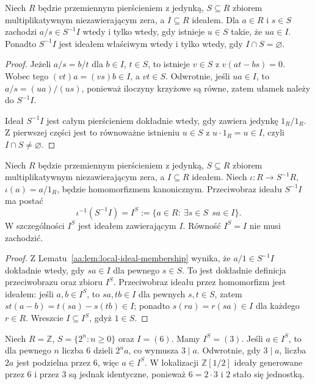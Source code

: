\begin{lemat}
\label{aa:lem:local-ideal-membership}
Niech $R$ będzie przemiennym pierścieniem z jedynką,
$S\subseteq R$ zbiorem multiplikatywnym niezawierającym
zera, a $I\subseteq R$ ideałem. Dla $a\in R$ i $s\in S$ zachodzi
$a/s\in S^{-1}I$ wtedy i tylko wtedy, gdy
istnieje $u\in S$ takie, że $ua\in I$.
Ponadto $S^{-1}I$ jest ideałem właściwym wtedy
i tylko wtedy, gdy $I\cap S=\varnothing$.
\end{lemat}
\begin{proof}
Jeżeli $a/s=b/t$ dla $b\in I$, $t\in S$,
to istnieje $v\in S$ z $v(at-bs)=0$.
Wobec tego $(vt)a=(vs)b\in I$, a $vt\in S$.
Odwrotnie, jeśli $ua\in I$, to
$a/s=(ua)/(us)$, ponieważ iloczyny krzyżowe są
równe, zatem ułamek należy do $S^{-1}I$.

Ideał $S^{-1}I$ jest całym pierścieniem dokładnie wtedy,
gdy zawiera jedynkę $1_R/1_R$. Z pierwszej części
jest to równoważne istnieniu $u\in S$ z
$u\cdot1_R=u\in I$, czyli $I\cap S\ne\varnothing$.
\end{proof}

\begin{twierdzenie}
\label{aa:tw:localization-saturation}
Niech $R$ będzie przemiennym pierścieniem z jedynką,
$S\subseteq R$ zbiorem multiplikatywnym niezawierającym
zera, a $I\subseteq R$ ideałem. Niech
$\iota:R\to S^{-1}R$, $\iota(a)=a/1_R$, będzie
homomorfizmem kanonicznym. Przeciwobraz ideału
$S^{-1}I$ ma postać
\[
 \iota^{-1}(S^{-1}I)=I^S
 :=\{a\in R:\ \exists s\in S\ \ sa\in I\}.
\]
W szczególności $I^S$ jest ideałem zawierającym $I$.
Równość $I^S=I$ nie musi zachodzić.
\end{twierdzenie}
\begin{proof}
Z Lematu~\ref{aa:lem:local-ideal-membership} wynika,
że $a/1\in S^{-1}I$ dokładnie wtedy, gdy $sa\in I$
dla pewnego $s\in S$. To jest dokładnie definicja
przeciwobrazu oraz zbioru $I^S$.
Przeciwobraz ideału przez homomorfizm jest ideałem:
jeśli $a,b\in I^S$, to $sa,tb\in I$ dla pewnych
$s,t\in S$, zatem $st(a-b)=t(sa)-s(tb)\in I$;
ponadto $s(ra)=r(sa)\in I$ dla każdego $r\in R$.
Wreszcie $I\subseteq I^S$, gdyż $1\in S$.
\end{proof}

\begin{przyklad}
\label{aa:prz:localization-saturation-z}
Niech $R=\mathbb Z$, $S=\{2^n:n\ge0\}$
oraz $I=(6)$. Mamy $I^S=(3)$.
Jeśli $a\in I^S$, to dla pewnego $n$ liczba $6$
dzieli $2^na$, co wymusza $3\mid a$.
Odwrotnie, gdy $3\mid a$, liczba $2a$ jest
podzielna przez $6$, więc $a\in I^S$.
W lokalizacji $\mathbb Z[1/2]$ ideały generowane
przez $6$ i przez $3$ są jednak identyczne,
ponieważ $6=2\cdot3$ i $2$ stało się jednostką.
\end{przyklad}

